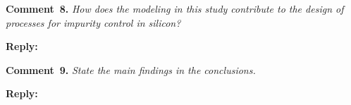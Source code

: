 \documentclass[a4paper,fleqn]{cas-sc}
\begin{document}
%
%
\vspace{1cm}
\noindent
\textcolor[rgb]{0.00,0.50,1.00}{\textbf{Comment~8.}}
\emph{How does the modeling in this study contribute to the design of processes for impurity control in silicon?}


\noindent
\textcolor[rgb]{0.51,0.00,0.00}{\textbf{Reply:}}



\vspace{1cm}
\noindent
\textcolor[rgb]{0.00,0.50,1.00}{\textbf{Comment~9.}}
\emph{State the main findings in the conclusions.}


\noindent
\textcolor[rgb]{0.51,0.00,0.00}{\textbf{Reply:}}




\end{document}
